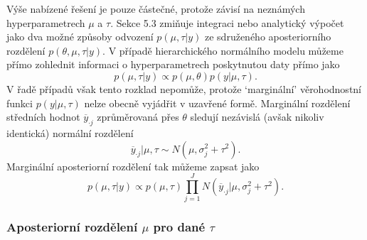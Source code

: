 Výše nabízené řešení je pouze částečné, protože závisí na neznámých hyperparametrech $\mu$ a $\tau$. Sekce 5.3 zmiňuje integraci nebo analytický výpočet jako dva možné způsoby odvození $p(\mu, \tau | y)$ ze sdruženého aposteriorního rozdělení $p(\theta, \mu, \tau | y)$. V případě hierarchického normálního modelu můžeme přímo zohlednit informaci o hyperparametrech poskytnutou daty přímo jako
\begin{equation}
p(\mu, \tau | y) \varpropto p(\mu, \theta)p(y | \mu, \tau).
\end{equation}
V řadě případů však tento rozklad nepomůže, protože `marginální' věrohodnostní funkci $p(y| \mu, \tau)$ nelze obecně vyjádřit v uzavřené formě. Marginální rozdělení středních hodnot $\overline{y}_{\cdot j}$ zprůměrovaná přes $\theta$ sledují nezávislá (avšak nikoliv identická) normální rozdělení
\begin{equation}
\overline{y}_{\cdot j} | \mu, \tau \sim N(\mu, \sigma_j^2 + \tau^2).
\end{equation}
Marginální aposteriorní rozdělení tak můžeme zapsat jako
\begin{equation}
p(\mu, \tau | y) \varpropto p(\mu, \tau) \prod_{j = 1}^J N(\overline{y}_{\cdot j} | \mu, \sigma_j^2 + \tau^2).
\end{equation}

\subsubsection{Aposteriorní rozdělení $\mu$ pro dané $\tau$}

